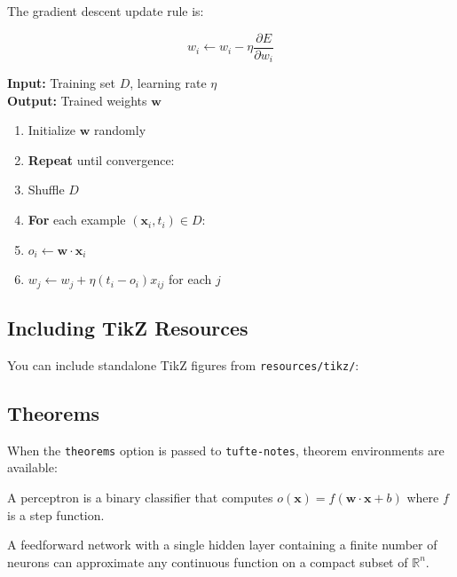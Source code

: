 \documentclass{tufte-handout}
\begin{document}
The gradient descent update rule is:

\begin{equation}
    w_i \leftarrow w_i - \eta \frac{\partial E}{\partial w_i}
    \label{eq:gd}
\end{equation}

\begin{algorithm}[h]
\caption{Stochastic Gradient Descent}
\textbf{Input:} Training set $D$, learning rate $\eta$ \\
\textbf{Output:} Trained weights $\mathbf{w}$
\begin{enumerate}
    \item Initialize $\mathbf{w}$ randomly
    \item \textbf{Repeat} until convergence:
    \item \quad Shuffle $D$
    \item \quad \textbf{For} each example $(\mathbf{x}_i, t_i) \in D$:
    \item \qquad $o_i \leftarrow \mathbf{w} \cdot \mathbf{x}_i$
    \item \qquad $w_j \leftarrow w_j + \eta (t_i - o_i) x_{ij}$ for each $j$
\end{enumerate}
\end{algorithm}

\subsection{Including TikZ Resources}\label{sec:resources}

You can include standalone TikZ figures from \texttt{resources/tikz/}:



\subsection{Theorems}\label{sec:theorems}

When the \texttt{theorems} option is passed to \texttt{tufte-notes}, theorem
environments are available:

\begin{defn}[Perceptron]
A perceptron is a binary classifier that computes
$o(\mathbf{x}) = f(\mathbf{w} \cdot \mathbf{x} + b)$ where $f$ is a step function.
\end{defn}

\begin{thm}
A feedforward network with a single hidden layer containing a finite number of
neurons can approximate any continuous function on a compact subset of $\mathbb{R}^n$.
\end{thm}
\end{document}

